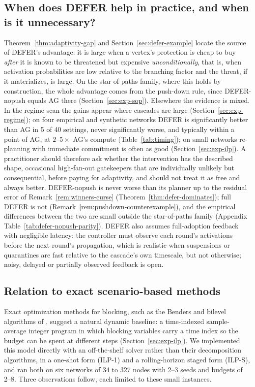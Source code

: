 \documentclass[preprint,11pt]{elsarticle}
\theoremstyle{definition}
\theoremstyle{remark}
\begin{document}
\subsection{When does DEFER help in practice, and when is it unnecessary?}

Theorem~\ref{thm:adaptivity-gap} and Section~\ref{sec:defer-example} locate the source of DEFER's advantage: it is large when a vertex's protection is cheap to buy \emph{after} it is known to be threatened but expensive \emph{unconditionally}, that is, when activation probabilities are low relative to the branching factor and the threat, if it materializes, is large. On the star-of-paths family, where this holds by construction, the whole advantage comes from the push-down rule, since DEFER-nopush equals AG there (Section~\ref{sec:exp-sop}). Elsewhere the evidence is mixed. In the regime scan the gains appear where cascades are large (Section~\ref{sec:exp-regime}); on four empirical and synthetic networks DEFER is significantly better than AG in 5 of 40 settings, never significantly worse, and typically within a point of AG, at $2$--$5\times$ AG's compute (Table~\ref{tab:timing}); on small networks re-planning with immediate commitment is often as good (Section~\ref{sec:exp-ilp}). A practitioner should therefore ask whether the intervention has the described shape, occasional high-fan-out gatekeepers that are individually unlikely but consequential, before paying for adaptivity, and should not treat it as free and always better. DEFER-nopush is never worse than its planner up to the residual error of Remark~\ref{rem:winners-curse} (Theorem~\ref{thm:defer-dominates}); full DEFER is not (Remark~\ref{rem:pushdown-counterexample}), and the empirical differences between the two are small outside the star-of-paths family (Appendix Table~\ref{tab:defer-nopush-parity}). DEFER also assumes full-adoption feedback with negligible latency: the controller must observe each round's activations before the next round's propagation, which is realistic when suspensions or quarantines are fast relative to the cascade's own timescale, but not otherwise; noisy, delayed or partially observed feedback is open.

\subsection{Relation to exact scenario-based methods}\label{sec:discussion-exact}

Exact optimization methods for blocking, such as the Benders and bilevel
algorithms of \citet{taninmis2022,taninmis2024}, suggest a natural dynamic
baseline: a time-indexed sample-average integer program in which blocking
variables carry a time index so the budget can be spent at different steps
(Section~\ref{sec:exp-ilp}). We implemented this model directly with an
off-the-shelf solver rather than their decomposition algorithms, in a one-shot
form (ILP-1) and a rolling-horizon staged form (ILP-S),
and ran both on six networks of 34 to 327 nodes with 2--3 seeds and budgets of
2--8. Three observations follow, each limited to these small instances.
\end{document}
